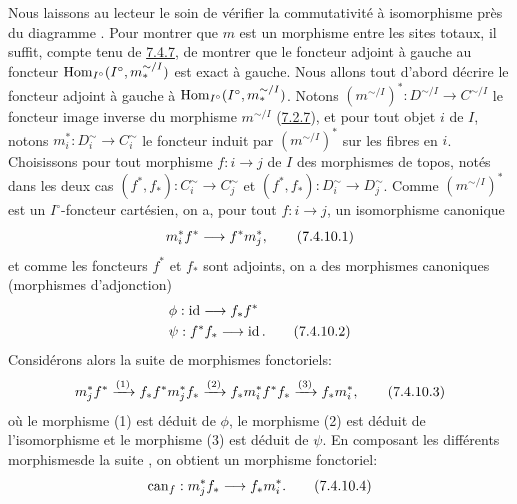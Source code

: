 \documentclass[10pt]{../fichiers-configuration-latex/smfart}
\begin{document}
Nous laissons au lecteur le soin de vérifier la commutativité à
isomorphisme près du diagramme . Pour montrer que
$m$ est un morphisme entre les sites totaux, il suffit, compte tenu
de \hyperref[VI.prop7.4.7]{7.4.7}, de montrer que le foncteur adjoint à gauche
au foncteur $\operatorname{Hom}_{I^{\circ}}(I^{\circ}, m^{\sim/I}_{\ast})$ est
exact à gauche. Nous allons tout d'abord décrire le
foncteur adjoint à gauche à $\operatorname{Hom}_{I^{\circ}}(I^{\circ}, m^{\sim/I}_{\ast})$. Notons $(m^{\sim/I})^{\ast} : D^{\sim/I} \to C^{\sim/I}$ le foncteur image
inverse du morphisme $m^{\sim/I}$ (\hyperref[VI.prop7.2.7]{7.2.7}), et pour tout
objet $i$ de $I$, notons $m^{\ast}_i : D^{\sim}_i \to C^{\sim}_i$ le
foncteur induit par $(m^{\sim/I})^{\ast}$ sur les fibres en $i$.
Choisissons pour tout morphisme $f : i \to j$ de $I$ des morphismes
de topos, notés dans les deux cas $(f^{\ast}, f_{\ast}) : C^{\sim}_i
\to C^{\sim}_j$ et $(f^{\ast}, f_{\ast}) : D^{\sim}_i \to
D^{\sim}_j$. Comme $(m^{\sim/I})^{\ast}$ est un $I^{\circ}$-foncteur
cartésien, on a, pour tout $f : i \to j$, un isomorphisme canonique
\begin{equation*}
m^{\ast}_i f^{\ast} \to f^{\ast} m^{\ast}_j{\quoi},\tag{7.4.10.1}
\end{equation*}
et comme les foncteurs $f^{\ast}$ et $f_{\ast}$ sont adjoints, on a
des morphismes canoniques (morphismes d'adjonction)
\begin{align*}
& \phi : \id \to f_{\ast} f^{\ast}\\
& \psi : f^{\ast} f_{\ast} \to \id{\quoi}. \tag{7.4.10.2}
\end{align*}
Considérons alors la suite de morphismes fonctoriels:
\begin{equation*}
m^{\ast}_j f^{\ast} \xrightarrow{(1)} f_{\ast} f^{\ast} m^{\ast}_j
f_{\ast} \xrightarrow{(2)} f_{\ast} m^{\ast}_i f^{\ast} f_{\ast}
\xrightarrow{(3)} f_{\ast} m^{\ast}_i{},\tag{7.4.10.3}
\end{equation*}
où le morphisme (1) est déduit de $\phi$, le morphisme (2) est déduit
de l'isomorphisme  et le morphisme (3) est déduit de
$\psi$. En composant les différents morphismes\pageoriginale de la
suite ,
on obtient un morphisme fonctoriel:
\begin{equation*}
\can_f : m^{\ast}_j f_{\ast} \to f_{\ast} m^{\ast}_i{\quoi}.\tag{7.4.10.4}
\end{equation*}
\end{document}
